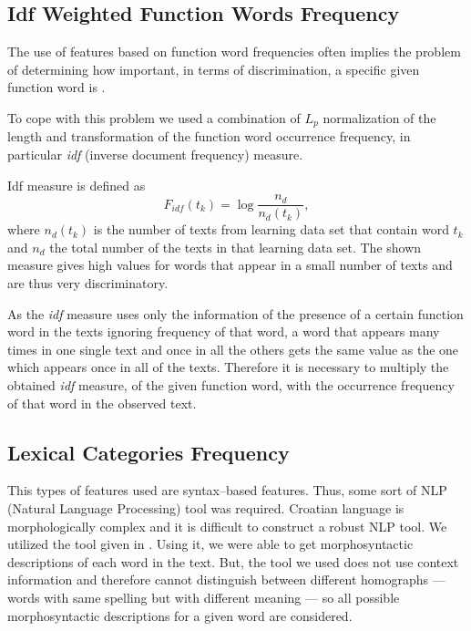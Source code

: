 \documentclass{llncs}
\begin{document}
\subsection{Idf Weighted Function Words Frequency}
\label{sec:funkcijske-rijeci-idf}

The use of features based on function word frequencies often implies the
problem of determining how important, in terms of discrimination, a
specific given function word is \cite{diederich2003authorship}.

To cope with this problem we used a combination of $L_p$ normalization of the
length and transformation of the function word occurrence frequency, in
particular \emph{idf} (inverse document frequency) measure.

Idf measure is defined as \cite{diederich2003authorship}
\begin{equation}
F_{idf}(t_k) = \log \frac{n_d}{n_d(t_k)},
\label{equ:idf}
\end{equation}
where $n_d(t_k)$ is the number of texts from learning data set that contain word
$t_k$ and $n_d$ the total number of the texts in that learning data set. The
shown measure gives high values for words that appear in a small number of
texts and are thus very discriminatory.

As the \emph{idf} measure uses only the information of the presence of a
certain function word in the texts ignoring frequency of that word, a word that appears
many times in one single text and once in all the others gets the same value as
the one which appears once in all of the texts. Therefore it is necessary to
multiply the obtained \emph{idf} measure, of the given function word, with the
occurrence frequency of that word in the observed text.

\subsection{Lexical Categories Frequency}
\label{sec:rijeci-grupe}
This types of features used are syntax--based features. Thus, some sort of NLP
(Natural Language Processing) tool was required. Croatian language is
morphologically complex and it is difficult to construct a robust NLP tool.
We utilized the tool given in \cite{snajder08automatic}. Using it, we were able to get
morphosyntactic descriptions of each word in the text. But, the tool we used
does not use context information and therefore cannot distinguish between different homographs
--- words with same spelling but with different meaning --- so all possible
morphosyntactic descriptions for a given word are considered.
\end{document}
